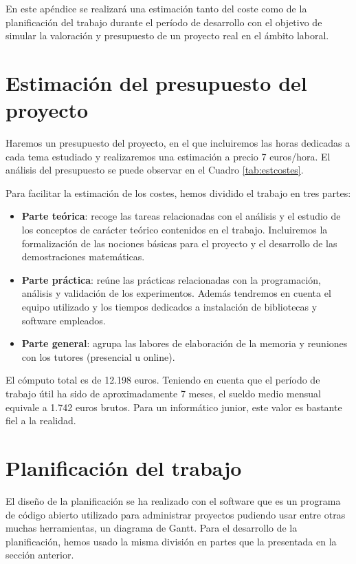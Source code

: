En este apéndice se realizará una estimación tanto del coste como de la planificación del trabajo durante el período de desarrollo con el objetivo de simular la valoración y presupuesto de un proyecto real en el ámbito laboral.

\section{Estimación del presupuesto del proyecto}

Haremos un presupuesto del proyecto, en el que incluiremos las horas dedicadas a cada tema estudiado y realizaremos una estimación a precio 7 euros/hora. El análisis del presupuesto se puede observar en el Cuadro \ref{tab:estcostes}.

Para facilitar la estimación de los costes, hemos dividido el trabajo en tres partes:

\begin{itemize}
    \item \textbf{Parte teórica}: recoge las tareas relacionadas con el análisis y el estudio de los conceptos de carácter teórico contenidos en el trabajo. Incluiremos la formalización de las nociones básicas para el proyecto y el desarrollo de las demostraciones matemáticas.
    \item \textbf{Parte práctica}: reúne las prácticas relacionadas con la programación, análisis y validación de los experimentos. Además tendremos en cuenta el equipo utilizado y los tiempos dedicados a instalación de bibliotecas y software empleados.
    \item \textbf{Parte general}: agrupa las labores de elaboración de la memoria y reuniones con los tutores (presencial u online).
\end{itemize}

El cómputo total es de 12.198 euros. Teniendo en cuenta que el período de trabajo útil ha sido de aproximadamente 7 meses, el sueldo medio mensual equivale a 1.742 euros brutos. Para un informático junior, este valor es bastante fiel a la realidad.

\section{Planificación del trabajo}

El diseño de la planificación se ha realizado con el software \cite{ganttproject} que es un programa de código abierto utilizado para administrar proyectos pudiendo usar entre otras muchas herramientas, un diagrama de Gantt. Para el desarrollo de la planificación, hemos usado la misma división en partes que la presentada en la sección anterior.

